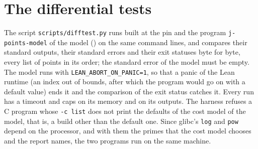 
\section{The differential tests}\label{sec:ccodeDifftests}

The script \verb|scripts/difftest.py| runs \jpoints{} built at the pin and the program
\verb|j-points-model| of the model () on the same command lines, and
compares their standard outputs, their standard errors and their exit statuses byte for byte, every
list of points in its order; the standard error of the model must be empty. The model runs with
\verb|LEAN_ABORT_ON_PANIC=1|, so that a panic of the Lean runtime (an index out of bounds, after
which the program would go on with a default value) ends it and the comparison of the exit status
catches it. Every run has a timeout and caps on its memory and on its outputs. The harness refuses a
C program whose \verb|-c list| does not print the defaults of the cost model of the model, that is,
a build other than the default one. Since glibc's \verb|log| and \verb|pow| depend on the processor,
and with them the primes that the cost model chooses and the report names, the two programs run on
the same machine.

